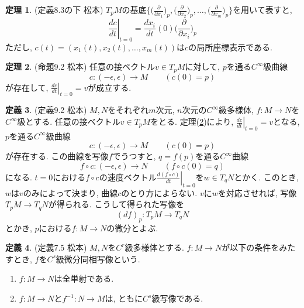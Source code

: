 \documentclass[uplatex]{suribt}
\theoremstyle{definition}
\newtheorem{theorem}{定理}[chapter]
\newtheorem{definition}[theorem]{定義}
\begin{document}
\begin{theorem}
(定義8.3の下 松本) \(T_pM\)の基底\(\big\{\big(\frac{\partial}{\partial x_1}\big)_p,\big(\frac{\partial}{\partial x_2}\big)_p,\ldots,\big(\frac{\partial}{\partial x_m}\big)_p\big\}\)を用いて表すと,
\begin{equation*}
    \left.\frac{dc}{dt}\right|_{t=0} = \frac{dx_i}{dt}(0)\bigg(\frac{\partial}{\partial x_i}\bigg)_p
\end{equation*}
ただし, \(c(t)=(x_1(t),x_2(t),\ldots,x_m(t))\)は\(c\)の局所座標表示である.
\end{theorem}

\begin{theorem}
\label{thm_velo}
(命題9.2 松本) 任意の接ベクトル\(v \in T_pM\)に対して, \(p\)を通る\(C^\infty\)級曲線
\begin{equation*}
    c:(-\epsilon,\epsilon) \to M \qquad (c(0)=p)
\end{equation*}
が存在して, \(\left.\frac{dc}{dt}\right|_{t=0} = v\)が成立する.
\end{theorem}

\begin{definition}
(定義9.2 松本) \(M,N\)をそれぞれ\(m\)次元, \(n\)次元の\(C^\infty\)級多様体, \(f:M \to N\)を\(C^\infty\)級とする. 任意の接ベクトル\(v \in T_pM\)をとる. 定理(\ref{thm_velo})により, \(\left.\frac{dc}{dt}\right|_{t=0} = v\)となる, \(p\)を通る\(C^\infty\)級曲線
\begin{equation*}
    c:(-\epsilon,\epsilon) \to M \qquad (c(0)=p)
\end{equation*}
が存在する. この曲線を写像\(f\)でうつすと, \(q=f(p)\)を通る\(C^\infty\)曲線
\begin{equation*}
    f \circ c:(-\epsilon,\epsilon) \to N \qquad (f \circ c(0) = q)
\end{equation*}
になる. \(t=0\)における\(f \circ c\)の速度ベクトル\(\left.\frac{d(f \circ c)}{dt}\right|_{t=0}\)を\(w \in T_qN\)とかく. このとき, \(w\)は\(v\)のみによって決まり, 曲線\(c\)のとり方によらない. \(v\)に\(w\)を対応させれば, 写像\(T_pM \to T_qN\)が得られる. こうして得られた写像を
\begin{equation*}
    (df)_p:T_pM \to T_qN
\end{equation*}
とかき, \(p\)における\(f:M \to N\)の微分とよぶ.
\end{definition}
\begin{definition}
(定義7.5 松本) \(M,N\)を\(C^r\)級多様体とする. \(f:M \to N\)が以下の条件をみたすとき, \(f\)を\(C^s\)級微分同相写像という.
\begin{enumerate}
    \item \(f:M \to N\)は全単射である.
    \item \(f:M \to N\)と\(f^{-1}:N \to M\)は, ともに\(C^s\)級写像である.
\end{enumerate}
\end{definition}
\end{document}
